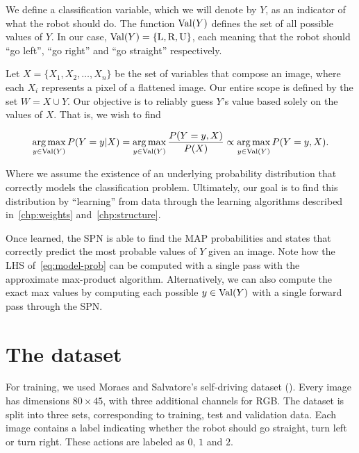 We define a classification variable, which we will denote by $Y$, as an indicator of what the robot
should do. The function $\operatorname*{\text{Val}}(Y)$ defines the set of all possible values of $Y$. In our case,
$\operatorname*{\text{Val}}(Y)=\{\text{L},\text{R}, \text{U}\}$, each meaning that the robot should ``go left'', ``go right'' and
``go straight'' respectively.

Let $X=\{X_1,X_2,\ldots,X_n\}$ be the set of variables that compose an image, where each $X_i$
represents a pixel of a flattened image. Our entire scope is defined by the set $W=X\cup Y$. Our
objective is to reliably guess $Y$'s value based solely on the values of $X$. That is, we wish to
find

\begin{equation}\label{eq:model-prob}
  \operatorname*{arg\,max}_{y\in\operatorname*{\text{Val}}(Y)} P(Y=y|X) = \operatorname*{arg\,max}_{y\in\operatorname*{\text{Val}}(Y)} \frac{P(Y=y,X)}{P(X)}\propto
  \operatorname*{arg\,max}_{y\in\operatorname*{\text{Val}}(Y)} P(Y=y,X).
\end{equation}

Where we assume the existence of an underlying probability distribution that correctly models the
classification problem. Ultimately, our goal is to find this distribution by ``learning'' from data
through the learning algorithms described in~\autoref{chp:weights} and~\autoref{chp:structure}.

Once learned, the SPN is able to find the MAP probabilities and states that correctly predict the
most probable values of $Y$ given an image. Note how the LHS of~\autoref{eq:model-prob} can be
computed with a single pass with the approximate max-product algorithm. Alternatively, we can also
compute the exact max values by computing each possible $y\in\operatorname*{\text{Val}}(Y)$ with a single forward pass
through the SPN.

\section{The dataset}

For training, we used Moraes and Salvatore's self-driving dataset (\cite{self-driving}). Every
image has dimensions $80\times 45$, with three additional channels for RGB. The dataset is split
into three sets, corresponding to training, test and validation data. Each image contains a label
indicating whether the robot should go straight, turn left or turn right. These actions are labeled
as $0$, $1$ and $2$.

